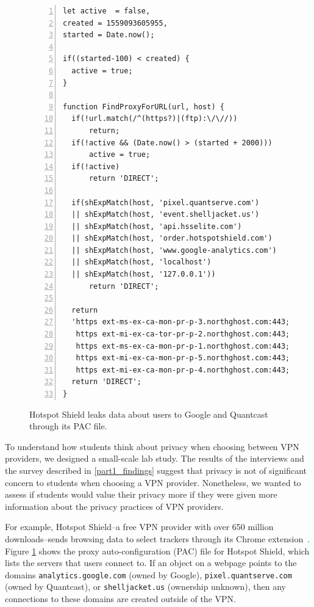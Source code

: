
\begin{figure}[t]
    \begin{lstlisting}[basicstyle=\fontsize{6.5}{11}\selectfont, xleftmargin=2.5em,frame=single,framexleftmargin=2.5em, numbers=left]
let active  = false,
created = 1559093605955,
started = Date.now();

if((started-100) < created) {
  active = true;
}

function FindProxyForURL(url, host) {
  if(!url.match(/^(https?)|(ftp):\/\//)) 
      return;
  if(!active && (Date.now() > (started + 2000))) 
      active = true;
  if(!active) 
      return 'DIRECT';

  if(shExpMatch(host, 'pixel.quantserve.com') 
  || shExpMatch(host, 'event.shelljacket.us') 
  || shExpMatch(host, 'api.hsselite.com') 
  || shExpMatch(host, 'order.hotspotshield.com') 
  || shExpMatch(host, 'www.google-analytics.com') 
  || shExpMatch(host, 'localhost') 
  || shExpMatch(host, '127.0.0.1')) 
      return 'DIRECT';

  return 
  'https ext-ms-ex-ca-mon-pr-p-3.northghost.com:443;
   https ext-mi-ex-ca-tor-pr-p-2.northghost.com:443;
   https ext-ms-ex-ca-mon-pr-p-1.northghost.com:443;
   https ext-mi-ex-ca-mon-pr-p-5.northghost.com:443;
   https ext-mi-ex-ca-mon-pr-p-4.northghost.com:443;';
  return 'DIRECT';
}
    \end{lstlisting}
\caption{Hotspot Shield leaks data about users to Google and Quantcast through its PAC file.}
\label{fig:hotspot_pac}
\end{figure}

To understand how students think about privacy when choosing between VPN
providers, we designed a small-scale lab study.  The results of the interviews
and the survey described in \ref{part1_findings} suggest that privacy is not of
significant concern to students when choosing a VPN provider.
Nonetheless, we wanted to assess if students would value their privacy more if
they were given more information about the privacy practices of VPN providers.

For example, Hotspot Shield--a free VPN
provider with over 650 million downloads--sends browsing data to select trackers through its Chrome extension~\cite{hotspot_shield, windscribe_hotspot}. Figure \ref{fig:hotspot_pac} shows the proxy auto-configuration (PAC) file for Hotspot Shield, which lists the servers that users connect to. If an object on a webpage points to the domains \texttt{analytics.google.com} (owned by Google), \texttt{pixel.quantserve.com} (owned by Quantcast), or \texttt{shelljacket.us} (ownership unknown), then any connections to these domains are created outside of the VPN. 

